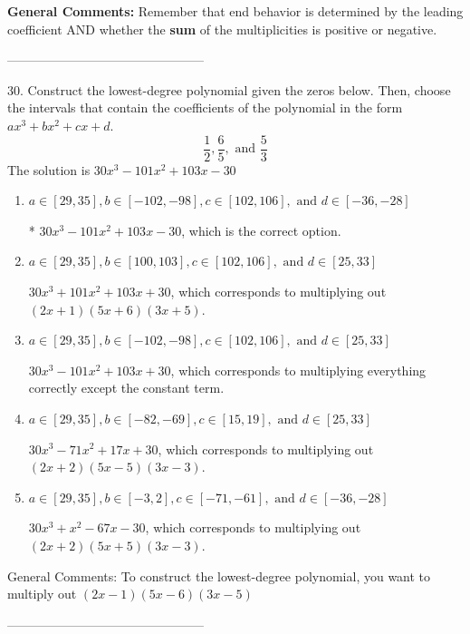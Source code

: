 \documentclass{article}[14pt]
\begin{document}
\textbf{General Comments:} Remember that end behavior is determined by the leading coefficient AND whether the \textbf{sum} of the multiplicities is positive or negative.

-----------------------------------------------

30. Construct the lowest-degree polynomial given the zeros below. Then, choose the intervals that contain the coefficients of the polynomial in the form $ax^3+bx^2+cx+d$.
$$ \frac{1}{2}, \frac{6}{5}, \text{ and } \frac{5}{3} $$ 
The solution is $ 30x^{3} -101 x^{2} +103 x -30 $ 

\begin{enumerate}[label=\Alph*.] 
\item $ a \in [29, 35], b \in [-102, -98], c \in [102, 106], \text{ and } d \in [-36, -28] $ 

 * $30x^{3} -101 x^{2} +103 x -30$, which is the correct option. 
\item $ a \in [29, 35], b \in [100, 103], c \in [102, 106], \text{ and } d \in [25, 33] $ 

 $30x^{3} +101 x^{2} +103 x + 30$, which corresponds to multiplying out $(2x + 1)(5x + 6)(3x + 5)$. 
\item $ a \in [29, 35], b \in [-102, -98], c \in [102, 106], \text{ and } d \in [25, 33] $ 

 $30x^{3} -101 x^{2} +103 x + 30$, which corresponds to multiplying everything correctly except the constant term. 
\item $ a \in [29, 35], b \in [-82, -69], c \in [15, 19], \text{ and } d \in [25, 33] $ 

 $30x^{3} -71 x^{2} +17 x + 30$, which corresponds to multiplying out $(2x + 2)(5x -5)(3x -3)$. 
\item $ a \in [29, 35], b \in [-3, 2], c \in [-71, -61], \text{ and } d \in [-36, -28] $ 

 $30x^{3} + x^{2} -67 x -30$, which corresponds to multiplying out $(2x + 2)(5x + 5)(3x -3)$. 
\end{enumerate} 
 
General Comments: To construct the lowest-degree polynomial, you want to multiply out $(2x -1)(5x -6)(3x -5)$

-----------------------------------------------
\end{document}
